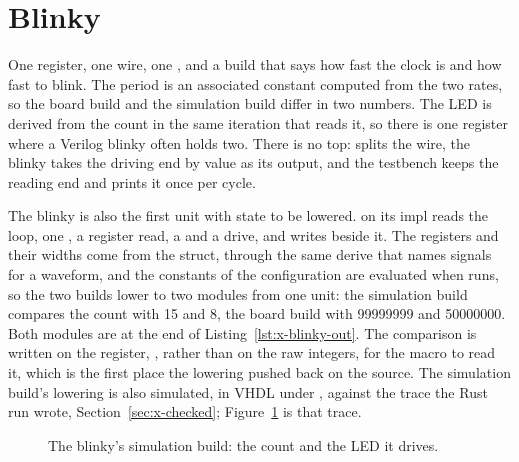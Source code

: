 \section{Blinky}
\label{sec:x-blinky}

One register, one wire, one , and a build that says how
fast the clock is and how fast to blink. The period is an associated
constant computed from the two rates, so the board build and the
simulation build differ in two numbers. The LED is derived from the
count in the same iteration that reads it, so there is one register
where a Verilog blinky often holds two. There is no top: 
splits the wire, the blinky takes the driving end by value as its
output, and the testbench keeps the reading end and prints it once per
cycle.

The blinky is also the first unit with state to be lowered.
\code{\#[lower]} on its  impl reads the  loop,
one , a register read, a  and a drive,
and writes  beside it. The registers and
their widths come from the struct, through the same  derive
that names signals for a waveform, and the constants of the
configuration are evaluated when  runs, so the two
builds lower to two modules from one unit: the simulation build
compares the count with 15 and 8, the board build with 99999999 and
50000000. Both modules are at the end of Listing~\ref{lst:x-blinky-out}.
The comparison is written on the register, , rather
than on the raw integers, for the macro to read it, which is the first
place the lowering pushed back on the source. The simulation build's
lowering is also simulated, in VHDL under , against the
trace the Rust run wrote, Section~\ref{sec:x-checked};
Figure~\ref{fig:x-blinky} is that trace.

\begin{figure}[htbp]
\centering

\caption{The blinky's simulation build: the count and the LED it drives.}
\label{fig:x-blinky}
\end{figure}




